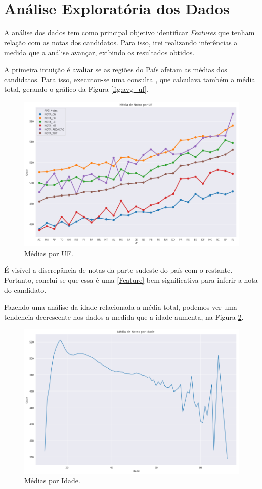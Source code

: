 \documentclass{article}
\begin{document}
\newpage
\section{Análise Exploratória dos Dados}

A análise dos dados tem como principal objetivo identificar \emph{Features} que tenham relação com as notas dos candidatos. Para isso, irei realizando inferências a medida que a análise avançar, exibindo os resultados obtidos.

A primeira intuição é avaliar se as regiões do País afetam as médias dos candidatos. Para isso, executou-se uma consulta , que calculava também a média total, gerando o gráfico da Figura \ref{fig:avg_uf}.

\begin{figure}[H]
\centering
  \includegraphics[width= 0.8 \linewidth]{img/mean_by_uf.png}
  \caption{Médias por UF.}
  \label{fig:fig_maq_criad}
\end{figure}

É visível a discrepância de notas da parte sudeste do país com o restante. Portanto, concluí-se que essa é uma \ref{Feature} bem significativa para inferir a nota do candidato.

Fazendo uma análise da idade relacionada a média total, podemos ver uma tendencia decrescente nos dados a medida que a idade aumenta, na Figura \ref{fig:mean_by_age}. 

\begin{figure}[H]
\centering
  \includegraphics[width=0.8 \linewidth]{img/mean_by_age.png}
  \caption{Médias por Idade.}
  \label{fig:mean_by_age}
\end{figure}
\end{document}

